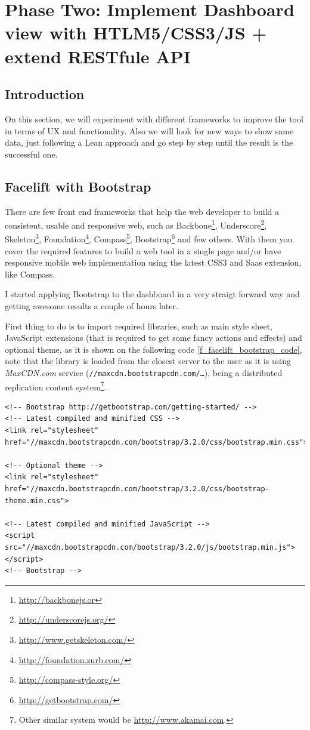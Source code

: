 \part{Phase Two: Implement Dashboard view with HTLM5/CSS3/JS + extend RESTfule
API}

\chapter*{Introduction}
\label{c_phasetwo}
On this section, we will experiment with different frameworks to improve the
tool in terms of UX and functionality. Also we will look for new ways to show
same data, just following a Lean approach and go step by step until the result
is the successful one.


\chapter{Facelift with Bootstrap}
There are few front end frameworks that help the web developer to build a
consistent, usable and responsive web, such as
Backbone\footnote{\url{http://backbonejs.or}}, 
Underscore\footnote{\url{http://underscorejs.org/}},
Skeleton\footnote{\url{http://www.getskeleton.com/}},
Foundation\footnote{\url{http://foundation.zurb.com/}},
Compass\footnote{\url{http://compass-style.org/}},
Bootstrap\footnote{\url{http://getbootstrap.com/}} and few others. With them
you cover the required features to build a web tool in a
single page and/or have responsive mobile web implementation using the latest
CSS3 and Saas extension, like Compass.

I started applying Bootstrap to the dashboard in a very straigt forward way and
getting awesome results a couple of hours later.

First thing to do is to import required libraries, such as main style sheet,
JavaScript extensions (that is required to get some fancy actions and effects)
and optional theme, as it is shown on the following code
\ref{f_facelift_bootstrap_code}, note that the library is loaded from the
closest server to the user as it is using \emph{MaxCDN.com} service
(\texttt{//maxcdn.bootstrapcdn.com/\ldots}), being a distributed replication
content system\footnote{Other similar system would be
\url{http://www.akamai.com}.}.

\begin{lstlisting}[style=html,breaklines=true,caption=Bootstrap\
required\ libraries,label=f_facelift_bootstrap_code]
<!-- Bootstrap http://getbootstrap.com/getting-started/ --> 
<!-- Latest compiled and minified CSS --> 
<link rel="stylesheet" href="//maxcdn.bootstrapcdn.com/bootstrap/3.2.0/css/bootstrap.min.css">

<!-- Optional theme -->
<link rel="stylesheet" href="//maxcdn.bootstrapcdn.com/bootstrap/3.2.0/css/bootstrap-theme.min.css">

<!-- Latest compiled and minified JavaScript -->
<script src="//maxcdn.bootstrapcdn.com/bootstrap/3.2.0/js/bootstrap.min.js"></script>
<!-- Bootstrap -->
\end{lstlisting} 

